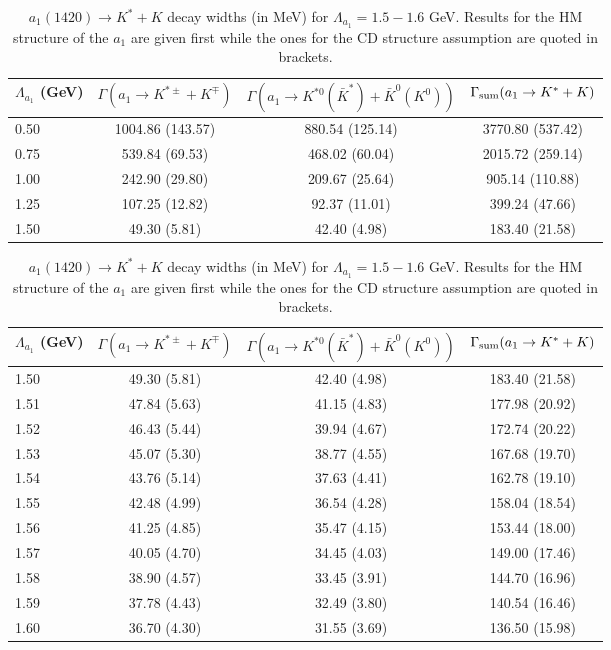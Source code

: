 \documentclass[aps,prd,floatfix,superscriptaddress,showpacs,showkeys]{revtex4}
\begin{document}
\begin{table}[htp]
\centering
\caption{$a_1(1420) \to K^* + K$ decay widths (in MeV) 
for $\Lambda_{a_1} = 0.5-1.5$ GeV. 
Results for the HM structure of the $a_1$ are given first 
while the ones for the CD structure assumption are 
quoted in brackets. } 
\medskip
\label{tab:theory1}
\def\arraystretch{1}
  \begin{tabular}{|l|c|c|c|}  
\hline 
$\Lambda_{a_1}$ (GeV) &  $\Gamma(a_1 \to K^{*\pm} + K^{\mp})$ 
                &  $\Gamma(a_1 \to K^{*0}(\bar{K}^*) + \bar K^0(K^0))$ 
                &  $\Gamma_{\rm sum}(a_1 \to K^* + K)$ \\
\hline\hline  
0.50 & 1004.86 (143.57) & 880.54 (125.14) & 3770.80 (537.42) \\
0.75 &  539.84  (69.53) & 468.02  (60.04) & 2015.72 (259.14) \\
1.00 &  242.90  (29.80) & 209.67  (25.64) &  905.14 (110.88) \\
1.25 &  107.25  (12.82) &  92.37  (11.01) &  399.24  (47.66) \\
1.50 &   49.30   (5.81) &  42.40   (4.98) &  183.40  (21.58) \\
\hline 
\end{tabular}


\centering
\caption{$a_1(1420) \to K^* + K$ decay widths (in MeV) 
for $\Lambda_{a_1} = 1.5-1.6$ GeV. 
Results for the HM structure of the $a_1$ are given first 
while the ones for the CD structure assumption are 
quoted in brackets.} 
\medskip
\label{tab:theory2}
\def\arraystretch{1}
  \begin{tabular}{|l|c|c|c|}  
\hline 
$\Lambda_{a_1}$ (GeV) &  $\Gamma(a_1 \to K^{*\pm} + K^{\mp})$ 
                &  $\Gamma(a_1 \to K^{*0}(\bar{K}^*) + \bar K^0(K^0))$ 
                &  $\Gamma_{\rm sum}(a_1 \to K^* + K)$ \\
\hline\hline  
1.50 & 49.30 (5.81) & 42.40 (4.98) & 183.40 (21.58) \\
1.51 & 47.84 (5.63) & 41.15 (4.83) & 177.98 (20.92) \\
1.52 & 46.43 (5.44) & 39.94 (4.67) & 172.74 (20.22) \\
1.53 & 45.07 (5.30) & 38.77 (4.55) & 167.68 (19.70) \\
1.54 & 43.76 (5.14) & 37.63 (4.41) & 162.78 (19.10) \\
1.55 & 42.48 (4.99) & 36.54 (4.28) & 158.04 (18.54) \\
1.56 & 41.25 (4.85) & 35.47 (4.15) & 153.44 (18.00) \\
1.57 & 40.05 (4.70) & 34.45 (4.03) & 149.00 (17.46) \\
1.58 & 38.90 (4.57) & 33.45 (3.91) & 144.70 (16.96) \\
1.59 & 37.78 (4.43) & 32.49 (3.80) & 140.54 (16.46) \\
1.60 & 36.70 (4.30) & 31.55 (3.69) & 136.50 (15.98) \\
\hline 
\end{tabular}
\end{table}
\end{document}

